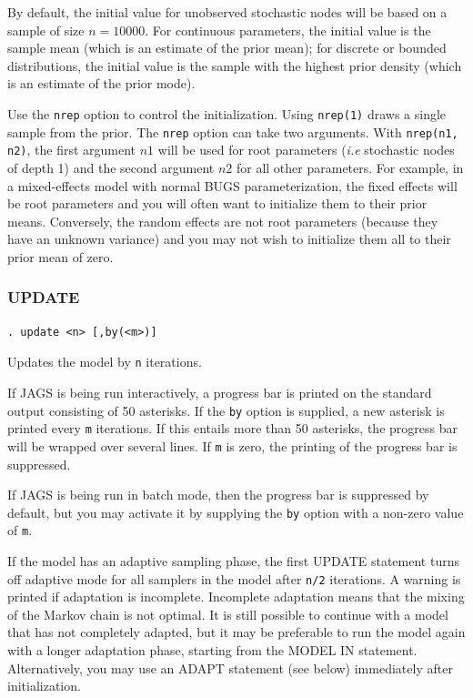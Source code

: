 \documentclass[11pt, a4paper, titlepage]{report}
\begin{document}
By default, the initial value for unobserved stochastic nodes will be
based on a sample of size $n=10000$. For continuous parameters, the
initial value is the sample mean (which is an estimate of the prior
mean); for discrete or bounded distributions, the initial value is the
sample with the highest prior density (which is an estimate of the prior
mode).

Use the \texttt{nrep} option to control the initialization.  Using
\texttt{nrep(1)} draws a single sample from the prior. The \texttt{nrep}
option can take two arguments. With \texttt{nrep(n1, n2)}, the first
argument $n1$ will be used for root parameters ({\em i.e} stochastic
nodes of depth 1) and the second argument $n2$ for all other parameters.
For example, in a mixed-effects model with normal BUGS parameterization,
the fixed effects will be root parameters and you will often want to
initialize them to their prior means. Conversely, the random effects
are not root parameters (because they have an unknown variance) and you
may not wish to initialize them all to their prior mean of zero.

\subsubsection{UPDATE}

\begin{verbatim}
. update <n> [,by(<m>)]
\end{verbatim}
Updates the model by \texttt{n} iterations. 

If JAGS is being run interactively, a progress bar is printed on the
standard output consisting of 50 asterisks. If the \texttt{by} option
is supplied, a new asterisk is printed every \texttt{m} iterations. If
this entails more than 50 asterisks, the progress bar will be wrapped
over several lines.  If \texttt{m} is zero, the printing of the
progress bar is suppressed.

If JAGS is being run in batch mode, then the progress bar is
suppressed by default, but you may activate it by supplying the
\texttt{by} option with a non-zero value of \texttt{m}.

If the model has an adaptive sampling phase, the first UPDATE
statement turns off adaptive mode for all samplers in the model after
\texttt{n/2} iterations. A warning is printed if adaptation is
incomplete. Incomplete adaptation means that the mixing of the Markov
chain is not optimal. It is still possible to continue with a model
that has not completely adapted, but it may be preferable to run the
model again with a longer adaptation phase, starting from the MODEL IN
statement. Alternatively, you may use an ADAPT statement (see below)
immediately after initialization.
\end{document}
